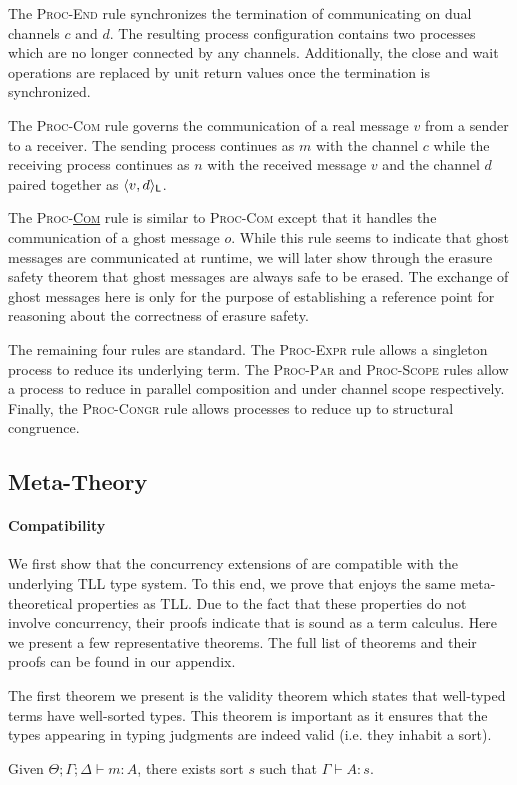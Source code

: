 The \textsc{Proc-End} rule synchronizes the termination of communicating on dual 
channels $c$ and $d$. The resulting process configuration contains two processes
which are no longer connected by any channels. Additionally, the close and wait 
operations are replaced by unit return values once the termination is synchronized.

The \textsc{Proc-Com} rule governs the communication of a real message $v$ from
a sender to a receiver. The sending process continues as $m$ with the channel
$c$ while the receiving process continues as $n$ with the received
message $v$ and the channel $d$ paired together as $\langle{{v},{d}}\rangle_{\textsf{L}}$.

The \textsc{Proc-\underline{Com}} rule is similar to \textsc{Proc-Com} except
that it handles the communication of a ghost message $o$. While this rule seems
to indicate that ghost messages are communicated at runtime, we will later show
through the erasure safety theorem that ghost messages are always safe to be erased.
The exchange of ghost messages here is only for the purpose of establishing a 
reference point for reasoning about the correctness of erasure safety.

The remaining four rules are standard. The \textsc{Proc-Expr} rule allows a
singleton process to reduce its underlying term. The \textsc{Proc-Par} and
\textsc{Proc-Scope} rules allow a process to reduce in parallel composition and
under channel scope respectively. Finally, the \textsc{Proc-Congr} rule allows
processes to reduce up to structural congruence.

\subsection{Meta-Theory}
\paragraph{\textbf{Compatibility}}
We first show that the concurrency extensions of \TLLC{} are compatible with the
underlying TLL type system. To this end, we prove that \TLLC{} enjoys the same
meta-theoretical properties as TLL. Due to the fact that these properties do not involve 
concurrency, their proofs indicate that \TLLC{} is sound as a term calculus.
Here we present a few representative theorems. The full list of theorems and their proofs
can be found in our appendix.

The first theorem we present is the validity theorem which states that
well-typed terms have well-sorted types. This theorem is important as it
ensures that the types appearing in typing judgments are indeed valid (i.e. they inhabit a sort).
\begin{theorem}[Validity]
  Given $\Theta ; \Gamma ; \Delta \vdash m : A$, there exists
  sort $s$ such that $\Gamma \vdash A : s$.
\end{theorem}

